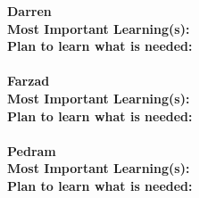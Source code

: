 \documentclass[12pt]{article}
\begin{document}
\noindent\textbf{Darren}\\
\textbf{Most Important Learning(s):}\\
\textbf{Plan to learn what is needed:}\\\\

\noindent\textbf{Farzad}\\
\textbf{Most Important Learning(s):}\\
\textbf{Plan to learn what is needed:}\\\\

\noindent\textbf{Pedram}\\
\textbf{Most Important Learning(s):}\\
\textbf{Plan to learn what is needed:}\\\\
\end{document}
